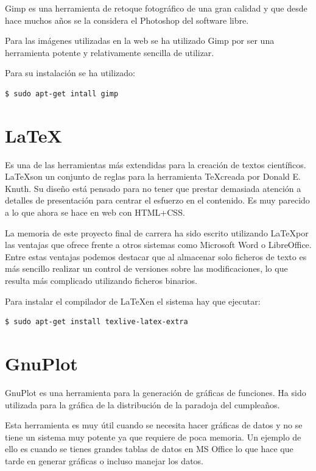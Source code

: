 Gimp es una herramienta de retoque fotográfico de una gran calidad y que desde hace muchos años se la considera el Photoshop del software libre.

Para las imágenes utilizadas en la web se ha utilizado Gimp por ser una herramienta potente y relativamente sencilla de utilizar.

Para su instalación se ha utilizado:

\begin{verbatim}
$ sudo apt-get intall gimp
\end{verbatim}

\section{\LaTeX}

Es una de las herramientas más extendidas para la creación de textos científicos. \LaTeX son un conjunto de reglas para la herramienta \TeX creada por Donald E. Knuth. Su diseño está pensado para no tener que prestar demasiada atención a detalles de presentación para centrar el esfuerzo en el contenido. Es muy parecido a lo que ahora se hace en web con HTML+CSS.

La memoria de este proyecto final de carrera ha sido escrito utilizando \LaTeX por las ventajas que ofrece frente a otros sistemas como Microsoft Word o LibreOffice. Entre estas ventajas podemos destacar que al almacenar solo ficheros de texto es más sencillo realizar un control de versiones sobre las modificaciones, lo que resulta más complicado utilizando ficheros binarios.

Para instalar el compilador de \LaTeX en el sistema hay que ejecutar:

\begin{verbatim}
$ sudo apt-get install texlive-latex-extra
\end{verbatim}

\section{GnuPlot}

GnuPlot es una herramienta para la generación de gráficas de funciones. Ha sido utilizada para la gráfica de la distribución de la paradoja del cumpleaños.

Esta herramienta es muy útil cuando se necesita hacer gráficas de datos y no se tiene un sistema muy potente ya que requiere de poca memoria. Un ejemplo de ello es cuando se tienes grandes tablas de datos en MS Office lo que hace que tarde en generar gráficas o incluso manejar los datos.

